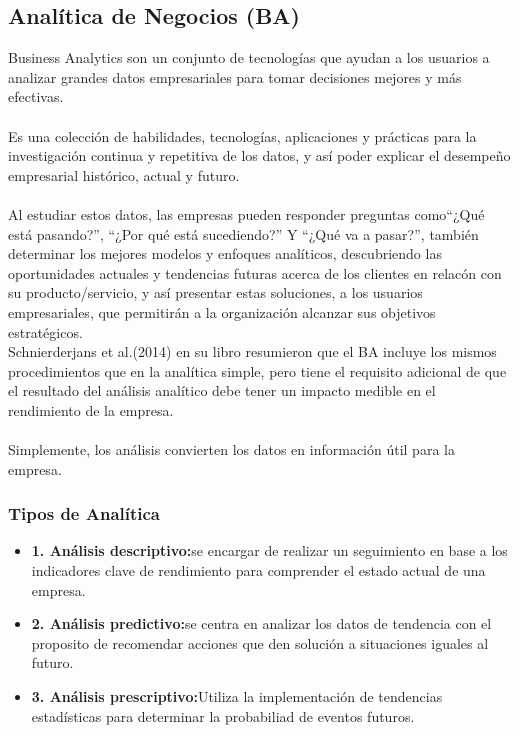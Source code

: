 \documentclass[preprint,12pt]{elsarticle}
\begin{document}
	\subsection{\textbf{Analítica de Negocios (BA) }}
	Business Analytics son un conjunto de tecnologías que ayudan a los usuarios a analizar grandes datos empresariales para tomar decisiones mejores y más efectivas. \\\\
Es una colección de habilidades, tecnologías, aplicaciones y prácticas para la investigación continua y repetitiva de los datos, y así poder explicar el desempeño empresarial histórico, actual y futuro\cite{referenciasosa1}.\\
\\Al estudiar estos datos, las empresas pueden responder preguntas como“¿Qué está pasando?”, “¿Por qué está sucediendo?” Y “¿Qué va a pasar?”\cite{referenciasosa3}, también determinar los mejores modelos y enfoques analíticos, descubriendo las oportunidades actuales y tendencias futuras acerca de los clientes en relacón con su producto/servicio, y así presentar estas soluciones, a los usuarios empresariales, que permitirán a la organización alcanzar sus objetivos estratégicos.\\
Schnierderjans et al.(2014) en su libro resumieron que el BA incluye los mismos procedimientos que en la analítica simple, pero tiene el requisito adicional de que el resultado del análisis analítico debe tener un impacto medible en el rendimiento de la empresa. \cite{referenciasosa2} \\
\\Simplemente, los análisis convierten los datos en información útil para la empresa.

	\subsubsection{\textbf{Tipos de Analítica }}
	\begin{itemize}
	\item{\textbf{1. Análisis descriptivo:}}se encargar de realizar un seguimiento en base a los indicadores  clave de rendimiento 			para comprender el estado actual de una empresa. 		
	\item {\textbf{2. Análisis  predictivo:}}se centra en analizar los datos de tendencia con el proposito de recomendar acciones que 
	den solución a situaciones iguales al futuro.
	\item {\textbf{3. Análisis prescriptivo:}}Utiliza la implementación de tendencias estadísticas para determinar la probabiliad de 			eventos futuros. 
	\end{itemize}
\end{document}
